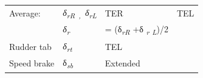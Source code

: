 \documentclass[
]{book}
\begin{document}
\begin{longtable}[]{@{}llll@{}}
\begin{minipage}[t]{0.35\columnwidth}
Average:\strut
\end{minipage} & \begin{minipage}[t]{0.13\columnwidth}\raggedright
\emph{δ\textsubscript{rR~,}~δ\textsubscript{rL}}\strut
\end{minipage} & \begin{minipage}[t]{0.26\columnwidth}\raggedright
TER\strut
\end{minipage} & \begin{minipage}[t]{0.14\columnwidth}\raggedright
TEL\strut
\end{minipage}\tabularnewline
\begin{minipage}[t]{0.35\columnwidth}\raggedright
\strut
\end{minipage} & \begin{minipage}[t]{0.13\columnwidth}\raggedright
\emph{δ\textsubscript{r}}\strut
\end{minipage} & \begin{minipage}[t]{0.26\columnwidth}\raggedright
= (δ\emph{\textsubscript{rR}} +δ \emph{\textsubscript{r}} \emph{\textsubscript{L}})/2\strut
\end{minipage} & \begin{minipage}[t]{0.14\columnwidth}\raggedright
\strut
\end{minipage}\tabularnewline
\begin{minipage}[t]{0.35\columnwidth}\raggedright
Rudder tab\strut
\end{minipage} & \begin{minipage}[t]{0.13\columnwidth}\raggedright
\emph{δ\textsubscript{rt}}\strut
\end{minipage} & \begin{minipage}[t]{0.26\columnwidth}\raggedright
TEL\strut
\end{minipage} & \begin{minipage}[t]{0.14\columnwidth}\raggedright
\strut
\end{minipage}\tabularnewline
\begin{minipage}[t]{0.35\columnwidth}\raggedright
Speed brake\strut
\end{minipage} & \begin{minipage}[t]{0.13\columnwidth}\raggedright
δ\emph{\textsubscript{sb}}\strut
\end{minipage} & \begin{minipage}[t]{0.26\columnwidth}\raggedright
Extended\strut
\end{minipage} & \begin{minipage}[t]{0.14\columnwidth}\raggedright
\strut
\end{minipage}\tabularnewline
\bottomrule
\end{longtable}
\end{document}
